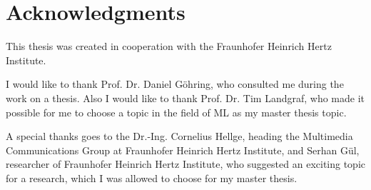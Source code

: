 \chapter*{Acknowledgments}
This thesis was created in cooperation with the Fraunhofer Heinrich Hertz Institute.

I would like to thank Prof. Dr. Daniel Göhring, who consulted me during the work on a thesis. Also I would like to thank Prof. Dr. Tim Landgraf, who made it possible for me to choose a topic in the field of ML as my master thesis topic.

A special thanks goes to the Dr.-Ing. Cornelius Hellge, heading the Multimedia Communications Group at Fraunhofer Heinrich Hertz Institute, and Serhan Gül, researcher of Fraunhofer Heinrich Hertz Institute, who suggested an exciting topic for a research, which I was allowed to choose for my master thesis.
